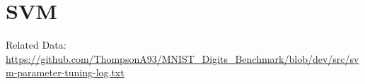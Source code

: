\chapter{SVM}
Related Data: \url{https://github.com/ThompsonA93/MNIST\_Digits\_Benchmark/blob/dev/src/svm-parameter-tuning-log.txt}
